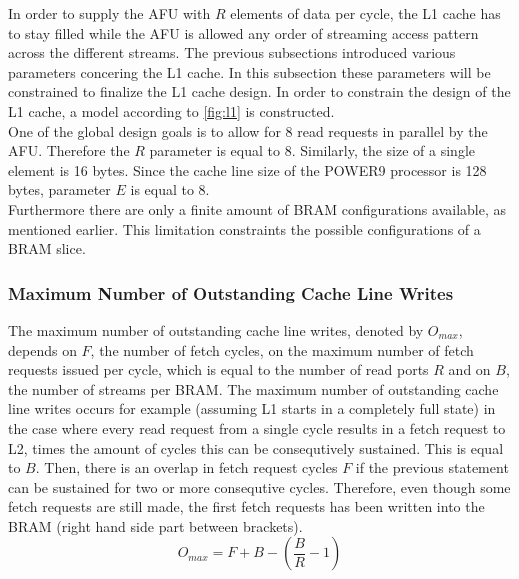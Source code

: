 In order to supply the AFU with $R$ elements of data per cycle, the L1 cache has to stay filled while the AFU is allowed any order of streaming access pattern across the different streams. The previous subsections introduced various parameters concering the L1 cache. In this subsection these parameters will be constrained to finalize the L1 cache design. In order to constrain the design of the L1 cache, a model according to \autoref{fig:l1} is constructed.\\
One of the global design goals is to allow for 8 read requests in parallel by the AFU. Therefore the $R$ parameter is equal to 8. Similarly, the size of a single element is 16 bytes. Since the cache line size of the POWER9 processor is 128 bytes, parameter $E$ is equal to 8.\\
Furthermore there are only a finite amount of BRAM configurations available, as mentioned earlier. This limitation constraints the possible configurations of a BRAM slice.\\

\subsubsection{Maximum Number of Outstanding Cache Line Writes}
The maximum number of outstanding cache line writes, denoted by $O_{max}$, depends on $F$, the number of fetch cycles, on the maximum number of fetch requests issued per cycle, which is equal to the number of read ports $R$ and on $B$, the number of streams per BRAM. The maximum number of outstanding cache line writes occurs for example (assuming L1 starts in a completely full state) in the case where every read request from a single cycle results in a fetch request to L2, times the amount of cycles this can be consequtively sustained. This is equal to $B$. Then, there is an overlap in fetch request cycles $F$ if the previous statement can be sustained for two or more consequtive cycles. Therefore, even though some fetch requests are still made, the first fetch requests has been written into the BRAM (right hand side part between brackets).
\begin{equation}
	O_{max} = F + B - (\frac{B}{R} - 1)
\end{equation}

